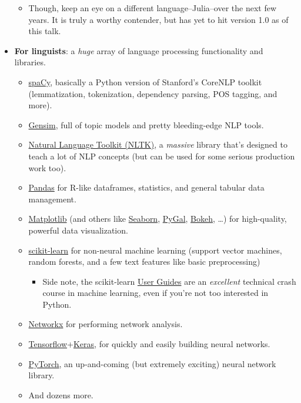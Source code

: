 \documentclass[11pt]{article}
\providecommand{\tightlist}{%
      \setlength{\itemsep}{0pt}\setlength{\parskip}{0pt}}
\begin{document}
\begin{itemize}
  \begin{itemize}
  \tightlist
  \item
    Though, keep an eye on a different language--Julia--over the next
    few years. It is truly a worthy contender, but has yet to hit
    version 1.0 as of this talk.
  \end{itemize}
\item
  \textbf{For linguists}: a \emph{huge} array of language processing
  functionality and libraries.

  \begin{itemize}
  \tightlist
  \item
    \href{https://spacy.io}{spaCy}, basically a Python version of
    Stanford's CoreNLP toolkit (lemmatization, tokenization, dependency
    parsing, POS tagging, and more).
  \item
    \href{https://radimrehurek.com/gensim/}{Gensim}, full of topic
    models and pretty bleeding-edge NLP tools.
  \item
    \href{http://www.nltk.org/}{Natural Language Toolkit (NLTK)}, a
    \emph{massive} library that's designed to teach a lot of NLP
    concepts (but can be used for some serious production work too).
  \item
    \href{http://pandas.pydata.org/}{Pandas} for R-like dataframes,
    statistics, and general tabular data management.
  \item
    \href{https://matplotlib.org/}{Matplotlib} (and others like
    \href{https://seaborn.pydata.org/}{Seaborn},
    \href{http://www.pygal.org/en/stable/}{PyGal},
    \href{https://bokeh.pydata.org/en/latest/}{Bokeh}, \ldots{}) for
    high-quality, powerful data visualization.
  \item
    \href{http://scikit-learn.org/stable/index.html}{scikit-learn} for
    non-neural machine learning (support vector machines, random
    forests, and a few text features like basic preprocessing)

    \begin{itemize}
    \tightlist
    \item
      Side note, the scikit-learn
      \href{http://scikit-learn.org/stable/user_guide.html}{User Guides}
      are an \emph{excellent} technical crash course in machine
      learning, even if you're not too interested in Python.
    \end{itemize}
  \item
    \href{https://networkx.github.io/}{Networkx} for performing network
    analysis.
  \item
    \href{https://www.tensorflow.org/}{Tensorflow}+\href{https://keras.io/}{Keras},
    for quickly and easily building neural networks.
  \item
    \href{http://pytorch.org/}{PyTorch}, an up-and-coming (but extremely
    exciting) neural network library.
  \item
    And dozens more.
  \end{itemize}
\end{itemize}
\end{document}
